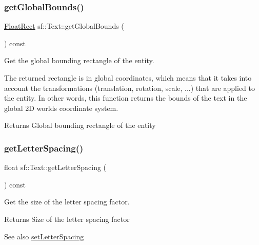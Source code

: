 \subsubsection{\texorpdfstring{getGlobalBounds()}{getGlobalBounds()}}
{\footnotesize\ttfamily \mbox{\hyperlink{classsf_1_1_rect}{Float\+Rect}} sf\+::\+Text\+::get\+Global\+Bounds (\begin{DoxyParamCaption}{ }\end{DoxyParamCaption}) const}



Get the global bounding rectangle of the entity. 

The returned rectangle is in global coordinates, which means that it takes into account the transformations (translation, rotation, scale, ...) that are applied to the entity. In other words, this function returns the bounds of the text in the global 2D world\textquotesingle{}s coordinate system.

\begin{DoxyReturn}{Returns}
Global bounding rectangle of the entity \begin{DoxyVerb}\end{DoxyVerb}
 
\end{DoxyReturn}
\mbox{\label{classsf_1_1_text_a028fc6e561bd9a0671254419b498b889}} 
\subsubsection{\texorpdfstring{getLetterSpacing()}{getLetterSpacing()}}
{\footnotesize\ttfamily float sf\+::\+Text\+::get\+Letter\+Spacing (\begin{DoxyParamCaption}{ }\end{DoxyParamCaption}) const}



Get the size of the letter spacing factor. 

\begin{DoxyReturn}{Returns}
Size of the letter spacing factor
\end{DoxyReturn}
\begin{DoxySeeAlso}{See also}
\mbox{\hyperlink{classsf_1_1_text_ab516110605edb0191a7873138ac42af2}{set\+Letter\+Spacing}} \begin{DoxyVerb}\end{DoxyVerb}
 
\end{DoxySeeAlso}
\mbox{\label{classsf_1_1_text_a670622e1c299dfd6518afe289c7cd248}} 
